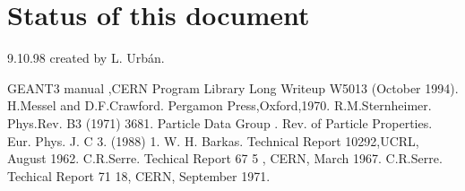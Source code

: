 \section{Status of this document}
  9.10.98  created by L. Urb\'an.
\begin{thebibliography}{99}

  GEANT3 manual ,CERN Program Library Long Writeup W5013 (October 1994).
  H.Messel and D.F.Crawford. Pergamon Press,Oxford,1970.
  R.M.Sternheimer. Phys.Rev. B3 (1971) 3681.
  Particle Data Group . Rev. of Particle Properties.
   Eur. Phys. J. C 3. (1988) 1.
  W. H. Barkas. Technical Report 10292,UCRL, August 1962.
  C.R.Serre. Techical Report 67 5 , CERN, March 1967.
  C.R.Serre. Techical Report 71 18, CERN, September 1971.

\end{thebibliography}


